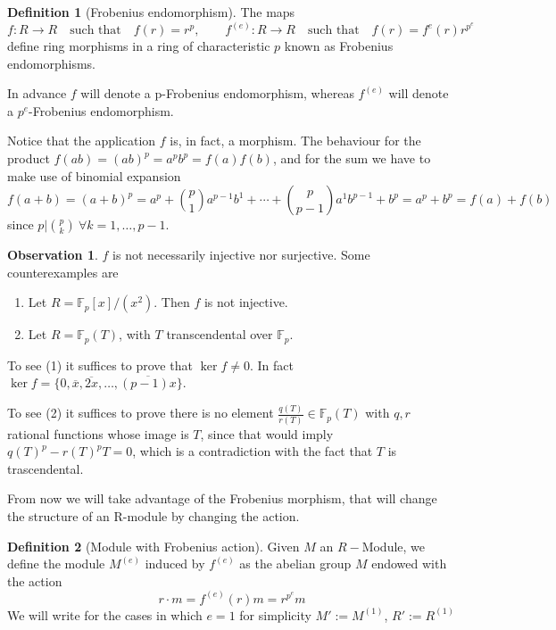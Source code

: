 \documentclass[leqno]{article}
\theoremstyle{definition}
\newtheorem{definition}{Definition}[section]
\newtheorem{observation}{Observation}[section]
\begin{document}
\begin{definition}[Frobenius endomorphism] The maps
\[
  f: R \to R \quad \text{such that} \quad f(r) = r^p, \qquad 
  f ^{(e)}: R \to R \quad \text{such that} \quad f(r) = f^e(r) r^{p^e}
\] 
define ring morphisms in a ring of characteristic $p$ known as Frobenius endomorphisms.
\end{definition}

In advance $f$ will denote a p-Frobenius endomorphism, whereas  $f^{(e)}$ will denote a  $p^e$-Frobenius endomorphism.

Notice that the application $f$ is, in fact, a morphism. The behaviour for the product $f(ab)=(ab)^p=a^pb^p=f(a)f(b)$, and for the sum we have to make use of binomial expansion
\[
  f(a+b) = (a+b)^p = a^p + \binom{p}{1} a^{p-1}b^1 + \cdots + \binom{p}{p-1}a^{1}b^{p-1} + b^p = a^p + b^p = f(a) + f(b)
\] 
since $p|\binom{p}{k} \ \forall k=1, \ldots, p-1$.

\begin{observation} $f$ is not necessarily injective nor surjective. Some counterexamples are
   \begin{enumerate}[topsep=-6pt, itemsep=0pt]
	 \item Let $R = \mathbb{F}_p[x] / (x^2)$. Then $f$ is not injective.
	 \item Let  $R = \mathbb{F}_p(T)$, with $T$ transcendental over  $\mathbb{F}_p$.
  \end{enumerate}
\end{observation}

To see (1) it suffices to prove that $\ker f\neq 0$. In fact $\ker f = \{0, \overline{x}, \overline{2x}, \ldots, \overline{(p-1)x}\}$.

To see (2) it suffices to prove there is no element $\frac{q(T)}{r(T)}\in \mathbb{F}_p(T)$ with $q, r$ rational functions whose image is  $T$, since that would imply  $q(T)^p-r(T)^pT = 0$, which is a contradiction with the fact that $T$ is trascendental.

From now we will take advantage of the Frobenius morphism, that will change the structure of an R-module by changing the action.

\begin{definition}[Module with Frobenius action] Given $M$ an  $R-$Module, we define the module  $M^{(e)}$ induced by  $f^{(e)}$ as the abelian group $M$ endowed with the action
  \[
  r \cdot  m  = f ^{(e)}(r)m = r ^{p^e} m
  \] 
We will write for the cases in which $e=1$ for simplicity $M':=M ^{(1)}$, $R':=R ^{(1)}$
\end{definition}
\end{document}
